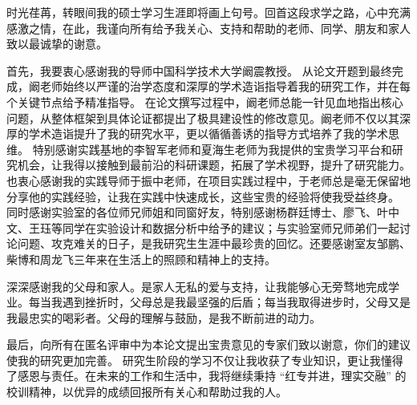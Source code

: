 
\begin{acknowledgements}
时光荏苒，转眼间我的硕士学习生涯即将画上句号。回首这段求学之路，心中充满感激之情，在此，我谨向所有给予我关心、支持和帮助的老师、同学、朋友和家人致以最诚挚的谢意。

首先，我要衷心感谢我的导师中国科学技术大学阚震教授。
从论文开题到最终完成，阚老师始终以严谨的治学态度和深厚的学术造诣指导着我的研究工作，并在每个关键节点给予精准指导。
在论文撰写过程中，阚老师总能一针见血地指出核心问题，从整体框架到具体论证都提出了极具建设性的修改意见。阚老师不仅以其深厚的学术造诣提升了我的研究水平，更以循循善诱的指导方式培养了我的学术思维。
特别感谢实践基地的李智军老师和夏海生老师为我提供的宝贵学习平台和研究机会，让我得以接触到最前沿的科研课题，拓展了学术视野，提升了研究能力。
也衷心感谢我的实践导师于振中老师，在项目实践过程中，于老师总是毫无保留地分享他的实践经验，让我在实践中快速成长，这些宝贵的经验将使我受益终身。
同时感谢实验室的各位师兄师姐和同窗好友，特别感谢杨群廷博士、廖飞、叶中文、王珏等同学在实验设计和数据分析中给予的建议；与实验室师兄师弟们一起讨论问题、攻克难关的日子，是我研究生生涯中最珍贵的回忆。还要感谢室友邹鹏、柴博和周龙飞三年来在生活上的照顾和精神上的支持。

深深感谢我的父母和家人。是家人无私的爱与支持，让我能够心无旁骛地完成学业。每当我遇到挫折时，父母总是我最坚强的后盾；每当我取得进步时，父母又是我最忠实的喝彩者。父母的理解与鼓励，是我不断前进的动力。

最后，向所有在匿名评审中为本论文提出宝贵意见的专家们致以谢意，你们的建议使我的研究更加完善。
研究生阶段的学习不仅让我收获了专业知识，更让我懂得了感恩与责任。在未来的工作和生活中，我将继续秉持 “红专并进，理实交融” 的校训精神，以优异的成绩回报所有关心和帮助过我的人。
\end{acknowledgements}
